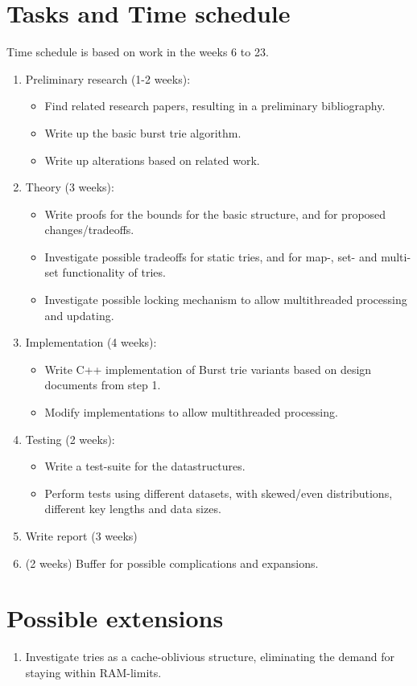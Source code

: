 \documentclass[a4paper, oneside, draft]{memoir}
\begin{document}
\section{Tasks and Time schedule}
Time schedule is based on work in the weeks 6 to 23.
\begin{enumerate}
    \item Preliminary research (1-2 weeks):
        \begin{itemize}
        \item Find related research papers, resulting in a preliminary bibliography.
        \item Write up the basic burst trie algorithm.
        \item Write up alterations based on related work.
        \end{itemize}
    \item Theory (3 weeks):
        \begin{itemize}
        \item Write proofs for the bounds for the basic structure, and for proposed
          changes/tradeoffs.
        \item Investigate possible tradeoffs for static tries, and for map-, set-
            and multi-set functionality of tries.
        \item Investigate possible locking mechanism to allow multithreaded
            processing and updating.
        \end{itemize}
    \item Implementation (4 weeks):
        \begin{itemize}
        \item Write C++ implementation of Burst trie variants based on design
                documents from step 1.
        \item Modify implementations to allow multithreaded processing.
        \end{itemize}
    \item Testing (2 weeks):
        \begin{itemize}
        \item Write a test-suite for the datastructures.
        \item Perform tests using different datasets, with 
                skewed/even distributions, different key lengths and data sizes.
        \end{itemize}
    \item Write report (3 weeks)
    \item (2 weeks) Buffer for possible complications and expansions.
\end{enumerate}

\section{Possible extensions}
\begin{enumerate}
    \item Investigate tries as a cache-oblivious structure, eliminating the
        demand for staying within RAM-limits.
\end{enumerate}
\nocite{Badr:2005, Dorji:2010, Nash2008, wejendorpgrathwohl2010, Heinz2002}


\end{document}
